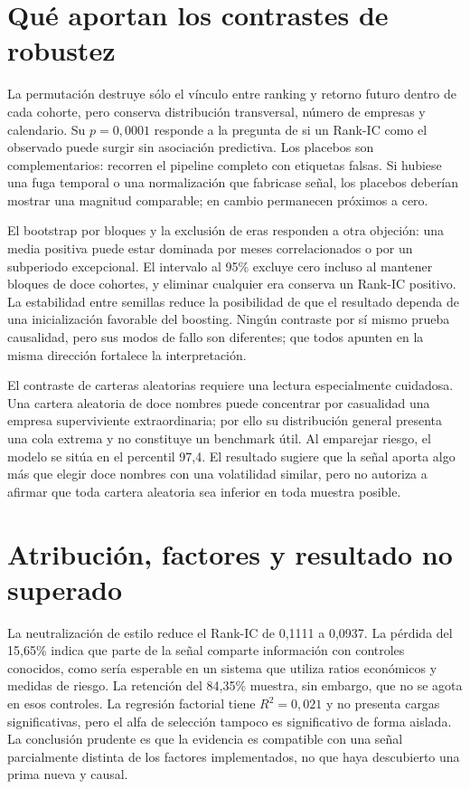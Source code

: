 \section{Qué aportan los contrastes de robustez}

La permutación destruye sólo el vínculo entre ranking y retorno futuro dentro de cada cohorte, pero
conserva distribución transversal, número de empresas y calendario. Su $p=0,0001$ responde a la
pregunta de si un Rank-IC como el observado puede surgir sin asociación predictiva. Los placebos son
complementarios: recorren el pipeline completo con etiquetas falsas. Si hubiese una fuga temporal o
una normalización que fabricase señal, los placebos deberían mostrar una magnitud comparable; en
cambio permanecen próximos a cero.

El bootstrap por bloques y la exclusión de eras responden a otra objeción: una media positiva puede
estar dominada por meses correlacionados o por un subperiodo excepcional. El intervalo al 95\%
excluye cero incluso al mantener bloques de doce cohortes, y eliminar cualquier era conserva un
Rank-IC positivo. La estabilidad entre semillas reduce la posibilidad de que el resultado dependa de
una inicialización favorable del boosting. Ningún contraste por sí mismo prueba causalidad, pero sus
modos de fallo son diferentes; que todos apunten en la misma dirección fortalece la interpretación.

El contraste de carteras aleatorias requiere una lectura especialmente cuidadosa. Una cartera
aleatoria de doce nombres puede concentrar por casualidad una empresa superviviente extraordinaria;
por ello su distribución general presenta una cola extrema y no constituye un benchmark útil. Al
emparejar riesgo, el modelo se sitúa en el percentil 97,4. El resultado sugiere que la señal aporta
algo más que elegir doce nombres con una volatilidad similar, pero no autoriza a afirmar que toda
cartera aleatoria sea inferior en toda muestra posible.

\section{Atribución, factores y resultado no superado}

La neutralización de estilo reduce el Rank-IC de 0,1111 a 0,0937. La pérdida del 15,65\% indica que
parte de la señal comparte información con controles conocidos, como sería esperable en un sistema
que utiliza ratios económicos y medidas de riesgo. La retención del 84,35\% muestra, sin embargo,
que no se agota en esos controles. La regresión factorial tiene $R^2=0,021$ y no presenta cargas
significativas, pero el alfa de selección tampoco es significativo de forma aislada. La conclusión
prudente es que la evidencia es compatible con una señal parcialmente distinta de los factores
implementados, no que haya descubierto una prima nueva y causal.

